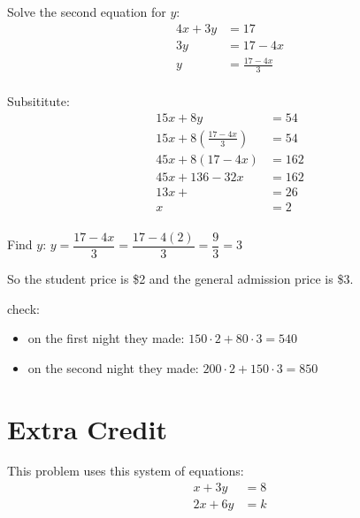 \documentclass[fleqn,addpoints]{exam}
\begin{document}
\begin{questions}
\begin{solution}[8 cm]
Solve the second equation for $y$:
\begin{align*}
  4x + 3y &= 17 \\
 3y &= 17 - 4x\\
 y  &= \frac{17 - 4x}{3} \\
\end{align*}

Subsititute:
\begin{align*}
  15x + 8y &= 54 \\
  15x + 8 \left( \frac{17 - 4x}{3} \right) &= 54 \\
  45x + 8(17-4x) &= 162 \\
  45x + 136 -32x &= 162 \\
  13x + &= 26 \\
  x &= 2 \\
\end{align*}

Find $y$: $y = \dfrac{17 - 4x}{3} = \dfrac{17 - 4(2)}{3} = \dfrac{9}{3} = 3$

So the student price is \$2 and the general admission price is \$3.

check: 
\begin{itemize}
  \item on the first night they made: $150 \cdot 2 + 80 \cdot 3 = 540$
  \item on the second night they made: $200 \cdot 2 + 150 \cdot 3 = 850$
\end{itemize}



\end{solution}

\pagebreak

\noaddpoints

\section{Extra Credit}
\question[10] 
This problem uses this system of equations:
\begin{align*}
  x + 3y &= 8 \\
  2x + 6y &= k \\
\end{align*}

\end{questions}
\end{document}

